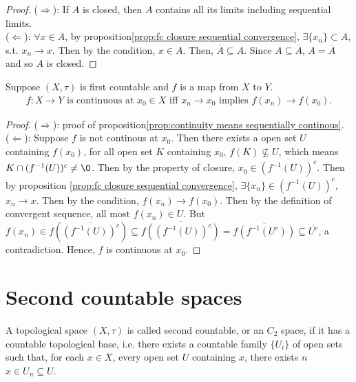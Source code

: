 \begin{proof}
    ($\Rightarrow$): If $A$ is closed, then $A$ contains all its limits including sequential limits.\\
    ($\Leftarrow$): $\forall x\in \overline{A}$, by proposition\ref{prop:fc closure sequential convergence},
    $\exists \{x_n\}\subset A$, s.t. $x_n\rightarrow x$. Then by the condition, $x\in A$. Then, $\overline{A}\subseteq A$.
    Since $A\subseteq \overline{A}$, $A=\overline{A}$ and so $A$ is closed. 
\end{proof}

\begin{corollary}{}{}
    Suppose $(X,\tau)$ is first countable and $f$ is a map from $X$ to $Y$.
    \begin{align*}
        f:X\rightarrow Y \text{ is continuous at } x_0\in X \text{ iff } x_n\rightarrow x_0 \text{ implies } f(x_n)\rightarrow f(x_0).
    \end{align*}
\end{corollary}
\begin{proof}
    ($\Rightarrow$): proof of proposition\ref{prop:continuity means sequentially continous}.\\
    ($\Leftarrow$): Suppose $f$ is not continous at $x_0$. Then there exists a open set $U$ containing $f(x_0)$, 
    for all open set $K$ containing $x_0$, $f(K)\not\subseteq U$, which means $K\cap (f^{-1}(U))^c\neq \O$. 
    Then by the property of closure, $x_0\in \overline{(f^{-1}(U))^c}$. Then by proposition \ref{prop:fc closure sequential convergence}, 
    $\exists \{x_n\}\in \overline{(f^{-1}(U))^c}$, $x_n\rightarrow x$. Then by the condition, $f(x_n)\rightarrow f(x_0)$.
    Then by the definition of convergent sequence, all most $f(x_n)\in U$. But $f(x_n)\in f(\overline{(f^{-1}(U))^c})\subseteq \overline{f((f^{-1}(U))^c)}= \overline{f(f^{-1}(U^c))}\subseteq \overline{U^c}$, a contradiction.
    Hence, $f$ is continuous at $x_0$.
\end{proof}

\section{Second countable spaces}

\begin{definition}{}{}
    A topological space $(X,\tau)$ is called second countable, or an $C_2$ space, if 
    it has a countable topological base, i.e.
    there exists a countable family $\{U_i\}$ of open sets such that, for each $x\in X$, 
    every open set $U$ containing $x$, there exists $n$  $x\in U_n\subseteq U$.
\end{definition}

